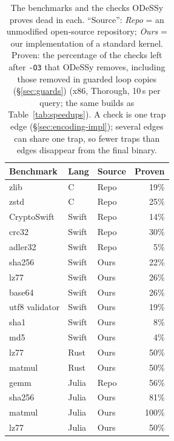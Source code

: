 \documentclass[acmsmall,screen,nonacm]{acmart}
\newcommand{\odessy}{ODeSSy}
\newcommand{\tool}{\odessy}
\begin{document}
\begin{table}
\caption{The benchmarks and the checks \tool{} proves dead in each.
``Source'': \emph{Repo} = an unmodified open-source repository;
\emph{Ours} = our implementation of a standard kernel. Proven: the
percentage of the checks left after \texttt{-O3} that \tool{} removes,
including those removed in guarded loop copies (\S\ref{sec:guards}) (x86, Thorough, 10\,s per query; the same builds
as Table~\ref{tab:speedups}). A check is one trap edge
(\S\ref{sec:encoding-impl}); several edges can share one trap, so fewer
traps than edges disappear from the final binary.}
\label{tab:static}
\small
\begin{tabular}{lllr}
\toprule
Benchmark & Lang & Source & Proven\\
\midrule
zlib & C & Repo & 19\%\\
zstd & C & Repo & 25\%\\
CryptoSwift & Swift & Repo & 14\%\\
crc32 & Swift & Repo & 30\%\\
adler32 & Swift & Repo & 5\%\\
sha256 & Swift & Ours & 22\%\\
lz77 & Swift & Ours & 26\%\\
base64 & Swift & Ours & 26\%\\
utf8 validator & Swift & Ours & 19\%\\
sha1 & Swift & Ours & 8\%\\
md5 & Swift & Ours & 4\%\\
lz77 & Rust & Ours & 50\%\\
matmul & Rust & Ours & 50\%\\
gemm & Julia & Repo & 56\%\\
sha256 & Julia & Ours & 81\%\\
matmul & Julia & Ours & 100\%\\
lz77 & Julia & Ours & 50\%\\
\bottomrule
\end{tabular}
\end{table}
\end{document}
